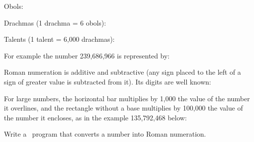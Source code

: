 \begin{exercices}
{\noindent Obols:\par\nopagebreak
\noindent\begin{minipage}[b][1.32cm]{\textwidth}\vfill{}\end{minipage}\par

\noindent Drachmas (1 drachma = 6 obols):\par\nopagebreak
\noindent\begin{minipage}[b][1.46cm]{\textwidth}\vfill{}\end{minipage}\par

\noindent Talents (1 talent = 6,000 drachmas):\par\nopagebreak
\noindent\begin{minipage}[b][1.46cm]{\textwidth}\vfill{}\end{minipage}\par

\noindent For example the number 239,686,966 is represented by:\par\nopagebreak
\noindent\begin{minipage}[b][1.89cm]{\textwidth}\vfill{}\end{minipage}\par

\tiret Roman numeration \cite{guitel} is additive and subtractive (any sign placed to the left
of a sign of greater value is subtracted from it). Its digits
are well known:\par\nopagebreak
\noindent\begin{minipage}[b][1.70cm]{\textwidth}\vfill{}\end{minipage}\par

For large numbers, the horizontal bar multiplies by 1,000 the value of the number it
overlines, and the rectangle without a base multiplies by 100,000 the value of the number it encloses,
as in the example 135,792,468 below:\par\nopagebreak
\noindent\begin{minipage}[b][1.90cm]{\textwidth}\vfill{}\end{minipage}\par

Write a \python\ program that converts a number into Roman
nu\-mer\-a\-tion.

}
\end{exercices}
